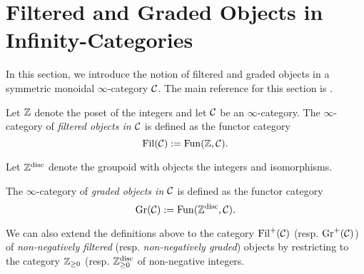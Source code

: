 %	
%

\section{Filtered and Graded Objects in Infinity-Categories}
In this section, we introduce the notion of filtered and graded objects in a symmetric monoidal $\infty$-category ${\mathcal{C}}$.
The main reference for this section is \cite{Brantner-Mathew}.
\begin{definition}
	Let ${\mathbb{Z}}$ denote the poset of the integers and let ${\mathcal{C}}$ be an $\infty$-category.
	The $\infty$-category of \emph{filtered objects in ${\mathcal{C}}$} is defined as the functor category 
	$$
	\operatorname{\operatorname{Fil}}({\mathcal{C}}) :=\operatorname{Fun}({\mathbb{Z}}, {\mathcal{C}}).
	$$
\end{definition}

Let ${\mathbb{Z}}^{\operatorname{disc}}$ denote the groupoid with objects the integers and isomorphisms.
\begin{definition}
	The $\infty$-category of \emph{graded objects in ${\mathcal{C}}$} is defined as the functor category 
	$$
	\operatorname{\operatorname{Gr}}({\mathcal{C}}):=\operatorname{Fun}({\mathbb{Z}}^{\operatorname{disc}}, {\mathcal{C}}).
	$$
\end{definition}

\begin{remark}
	We can also extend the definitions above to the category $\operatorname{\operatorname{Fil}}^{+}({\mathcal{C}})$ (resp. $\operatorname{Gr}^{+}({\mathcal{C}})$) of \emph{non-negatively filtered} (resp. \emph{non-negatively graded}) objects by restricting to the category ${\mathbb{Z}}_{\geq 0}$ (resp. ${\mathbb{Z}}^{\operatorname{disc}}_{\geq 0}$ of non-negative integers.
\end{remark}

